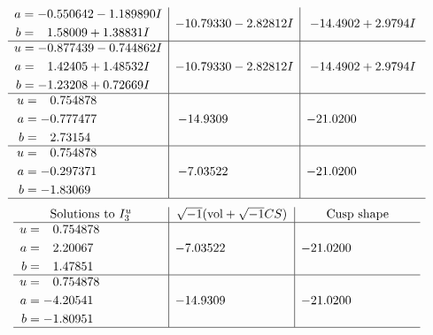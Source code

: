 \documentclass[1p]{elsarticle_modified}
\theoremstyle{definition}
\newcommand{\I}{\sqrt{-1}}
\begin{document}
$$\begin{array}{c|c|c}
\begin{aligned}
a &= -0.550642 - 1.189890 I \\
b &= \phantom{-}1.58009 + 1.38831 I\end{aligned}
 & -10.79330 - 2.82812 I & -14.4902 + 2.9794 I \\ \hline\begin{aligned}
u &= -0.877439 - 0.744862 I \\
a &= \phantom{-}1.42405 + 1.48532 I \\
b &= -1.23208 + 0.72669 I\end{aligned}
 & -10.79330 - 2.82812 I & -14.4902 + 2.9794 I \\ \hline\begin{aligned}
u &= \phantom{-}0.754878\phantom{ +0.000000I} \\
a &= -0.777477\phantom{ +0.000000I} \\
b &= \phantom{-}2.73154\phantom{ +0.000000I}\end{aligned}
 & -14.9309\phantom{ +0.000000I} & -21.0200\phantom{ +0.000000I} \\ \hline\begin{aligned}
u &= \phantom{-}0.754878\phantom{ +0.000000I} \\
a &= -0.297371\phantom{ +0.000000I} \\
b &= -1.83069\phantom{ +0.000000I}\end{aligned}
 & -7.03522\phantom{ +0.000000I} & -21.0200\phantom{ +0.000000I}\\
 \hline 
 \end{array}$$\newpage$$\begin{array}{c|c|c}  
\text{Solutions to }I^u_{3}& \I (\text{vol} + \sqrt{-1}CS) & \text{Cusp shape}\\
 \hline 
\begin{aligned}
u &= \phantom{-}0.754878\phantom{ +0.000000I} \\
a &= \phantom{-}2.20067\phantom{ +0.000000I} \\
b &= \phantom{-}1.47851\phantom{ +0.000000I}\end{aligned}
 & -7.03522\phantom{ +0.000000I} & -21.0200\phantom{ +0.000000I} \\ \hline\begin{aligned}
u &= \phantom{-}0.754878\phantom{ +0.000000I} \\
a &= -4.20541\phantom{ +0.000000I} \\
b &= -1.80951\phantom{ +0.000000I}\end{aligned}
 & -14.9309\phantom{ +0.000000I} & -21.0200\phantom{ +0.000000I}\\
 \hline 
 \end{array}$$\newpage
\end{document}
